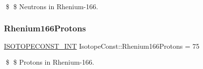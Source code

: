 \$ \$ Neutrons in Rhenium-\/166. \mbox{\label{group___isotope_const-_rhenium-_re166_ga986095c9b8cf8b6aa8f58787b977baef}} 
\subsubsection{\texorpdfstring{Rhenium166\+Protons}{Rhenium166Protons}}
{\footnotesize\ttfamily \mbox{\hyperlink{group___isotope_const-_macros_ga5f18360b3e99483a35c32d789e62621c}{I\+S\+O\+T\+O\+P\+E\+C\+O\+N\+S\+T\+\_\+\+I\+NT}} Isotope\+Const\+::\+Rhenium166\+Protons = 75}

\$ \$ Protons in Rhenium-\/166. 